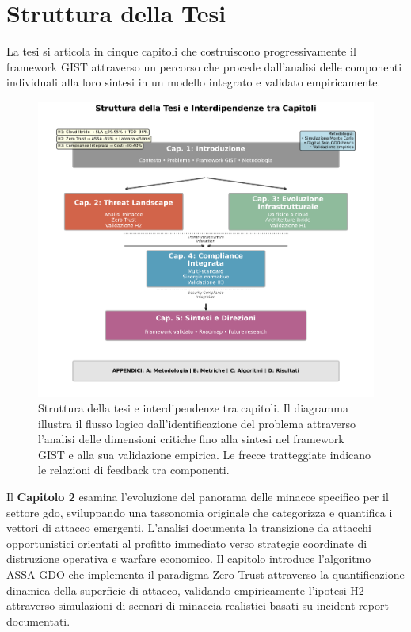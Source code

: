 \section{\texorpdfstring{Struttura della Tesi}{1.5 - Struttura della Tesi}}
\label{sec:struttura_tesi}

La tesi si articola in cinque capitoli che costruiscono progressivamente il framework GIST attraverso un percorso che procede dall'analisi delle componenti individuali alla loro sintesi in un modello integrato e validato empiricamente.

\begin{figure}[htbp]
\centering
\includegraphics[width=\textwidth]{thesis_figures/cap1/fig_1_4_thesis_structure.pdf}
\caption[Struttura della tesi e flusso logico dell'argomentazione]{Struttura della tesi e interdipendenze tra capitoli. Il diagramma illustra il flusso logico dall'identificazione del problema attraverso l'analisi delle dimensioni critiche fino alla sintesi nel framework GIST e alla sua validazione empirica. Le frecce tratteggiate indicano le relazioni di feedback tra componenti.}
\label{fig:thesis_structure}
\end{figure}

Il \textbf{Capitolo 2} esamina l'evoluzione del panorama delle minacce specifico per il settore \gls{gdo}, sviluppando una tassonomia originale che categorizza e quantifica i vettori di attacco emergenti. L'analisi documenta la transizione da attacchi opportunistici orientati al profitto immediato verso strategie coordinate di distruzione operativa e warfare economico. Il capitolo introduce l'algoritmo ASSA-GDO che implementa il paradigma Zero Trust attraverso la quantificazione dinamica della superficie di attacco, validando empiricamente l'ipotesi H2 attraverso simulazioni di scenari di minaccia realistici basati su incident report documentati.

